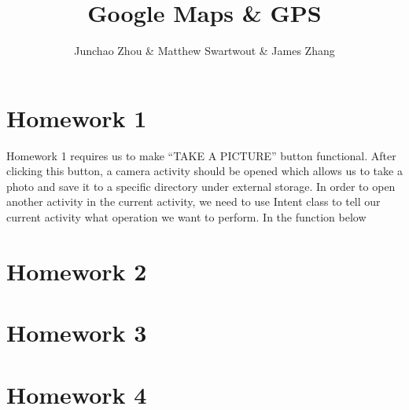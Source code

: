 \documentclass[]{article}
\title{Google Maps \& GPS}
\author{Junchao Zhou & Matthew Swartwout & James Zhang }
\begin{document}
\maketitle

\section{Homework 1}
Homework 1 requires us to make “TAKE A PICTURE” button functional. After clicking this button, a camera activity should be opened which allows us to take a photo and save it to a specific directory under external storage. 
In order to open another activity in the current activity, we need to use Intent class to tell our current activity what operation we want to perform. In the function below
\section{Homework 2}
\section{Homework 3}
\section{Homework 4}
\end{document}
